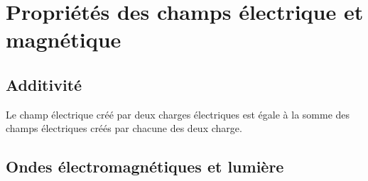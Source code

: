 
\section{Propriétés des champs électrique et magnétique}

\subsection{Additivité}
Le champ électrique créé par deux charges électriques est égale à la somme des champs électriques créés par chacune des deux charge.

\subsection{Ondes électromagnétiques et lumière}


